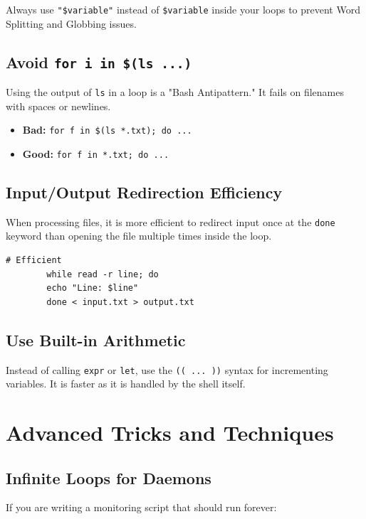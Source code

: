 \documentclass[12pt,a4paper]{article}
\begin{document}
	\begin{tcolorbox}[colback=red!5,colframe=red!75!black,title=The Golden Rule]
		Always use \texttt{"\$variable"} instead of \texttt{\$variable} inside your loops to prevent Word Splitting and Globbing issues.
	\end{tcolorbox}
	
	\subsection{Avoid \texttt{for i in \$(ls ...)}}
	Using the output of \texttt{ls} in a loop is a "Bash Antipattern." It fails on filenames with spaces or newlines.
	\begin{itemize}
		\item \textbf{Bad:} \texttt{for f in \$(ls *.txt); do ...}
		\item \textbf{Good:} \texttt{for f in *.txt; do ...}
	\end{itemize}
	
	\subsection{Input/Output Redirection Efficiency}
	When processing files, it is more efficient to redirect input once at the \texttt{done} keyword than opening the file multiple times inside the loop.
	
	\begin{lstlisting}[caption=Efficient redirection]
		# Efficient
		while read -r line; do
		echo "Line: $line"
		done < input.txt > output.txt
	\end{lstlisting}
	
	\subsection{Use Built-in Arithmetic}
	Instead of calling \texttt{expr} or \texttt{let}, use the \texttt{(( ... ))} syntax for incrementing variables. It is faster as it is handled by the shell itself.
	
	\newpage
	\section{Advanced Tricks and Techniques}
	
	\subsection{Infinite Loops for Daemons}
	If you are writing a monitoring script that should run forever:
	
\end{document}

